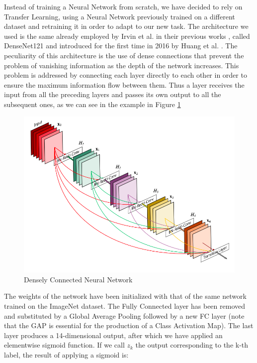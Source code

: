 \noindent Instead of training a Neural Network from scratch, we have decided to rely on Transfer Learning, using a Neural Network previously trained on a different dataset and retraining it in order to adapt to our new task. The architecture we used is the same already employed by Irvin et al. in their previous works \cite{irvin2019chexpert} \cite{rajpurkar2017chexnet}, called DenseNet121 and introduced for the first time in 2016 by Huang et al. \cite{densenet}. The peculiarity of this architecture is the use of dense connections that prevent the problem of vanishing information as the depth of the network increases. This problem is addressed by connecting each layer directly to each other in order to ensure the maximum information flow between them. Thus a layer receives the input from all the preceding layers and passes its own output to all the subsequent ones, as we can see in the example in Figure \ref{fig:figure_4.1} 

\begin{figure}[htbp!]
\centering
\includegraphics[scale=0.45]{Tesi/images/densenet}
\caption{Densely Connected Neural Network}
\label{fig:figure_4.1}
\end{figure}

The weights of the network have been initialized with that of the same network trained on the ImageNet dataset. The Fully Connected layer has been removed and substituted by a Global Average Pooling followed by a new \ac{FC} layer (note that the \ac{GAP} is essential for the production of a Class Activation Map).
The last layer produces a 14-dimensional output, after which we have applied an elementwise sigmoid function. If we call $z_{k}$ the output corresponding to the k-th label, the result of applying a sigmoid is: 
\vspace{3mm}

